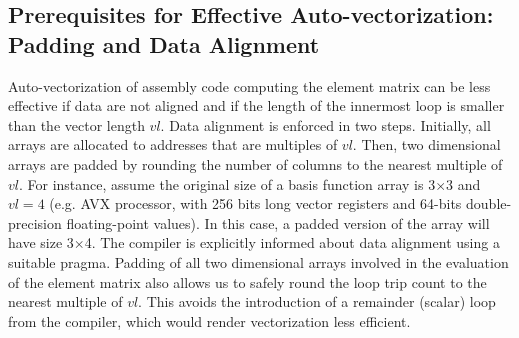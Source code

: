 \documentclass[conference]{IEEEtran}
\begin{document}

\subsection{Prerequisites for Effective Auto-vectorization: Padding and Data Alignment}
Auto-vectorization of assembly code computing the element matrix can be less effective if data are not aligned and if the length of the innermost loop is smaller than the vector length $vl$. Data alignment is enforced in two steps. Initially, all arrays are allocated to addresses that are multiples of $vl$. Then, two dimensional arrays are padded by rounding the number of columns to the nearest multiple of $vl$. For instance, assume the original size of a basis function array is 3$\times$3 and $vl=4$ (e.g. AVX processor, with 256 bits long vector registers and 64-bits double-precision floating-point values). In this case, a padded version of the array will have size 3$\times$4. The compiler is explicitly informed about data alignment using a suitable pragma. Padding of all two dimensional arrays involved in the evaluation of the element matrix also allows us to safely round the loop trip count to the nearest multiple of $vl$. This avoids the introduction of a remainder (scalar) loop from the compiler, which would render vectorization less efficient.

\end{document}
